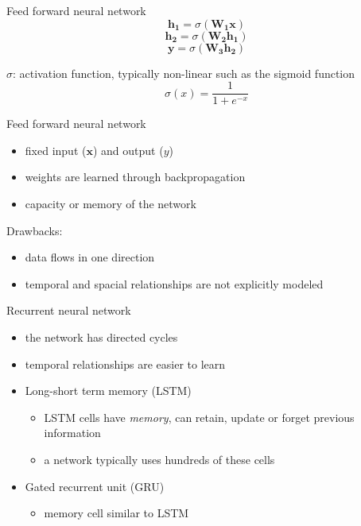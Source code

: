 \documentclass[bigger]{beamer}
\begin{document}
\begin{frame}{Feed forward neural network}
    \begin{equation*}
        \mathbf{h_1} = \sigma (\mathbf{W_1 x})
    \end{equation*}
    \begin{equation*}
        \mathbf{h_2} = \sigma (\mathbf{W_2 h_1})
    \end{equation*}
    \begin{equation*}
        \mathbf{y} = \sigma (\mathbf{W_3 h_2})
    \end{equation*}

$\sigma$: activation function, typically non-linear such as the sigmoid function
    \begin{equation*}
        \sigma(x) = \frac{1}{1 + e^{-x}}
    \end{equation*}

\end{frame}

\begin{frame}{Feed forward neural network}
    \begin{itemize}
        \item fixed input ($\mathbf{x}$) and output ($y$)
        \item weights are learned through backpropagation
        \item capacity or memory of the network
    \end{itemize}
    Drawbacks:
    \begin{itemize}
        \item data flows in one direction
        \item temporal and spacial relationships are not explicitly modeled
    \end{itemize}
\end{frame}

\begin{frame}{Recurrent neural network}
    \begin{itemize}
        \item the network has directed cycles
        \item temporal relationships are easier to learn
        \item Long-short term memory (LSTM)
            \begin{itemize}
                \item LSTM cells have \emph{memory}, can retain, update or forget previous information
                \item a network typically uses hundreds of these cells
            \end{itemize}
        \item Gated recurrent unit (GRU)
            \begin{itemize}
                \item memory cell similar to LSTM
            \end{itemize}
    \end{itemize}
\end{frame}
\end{document}
